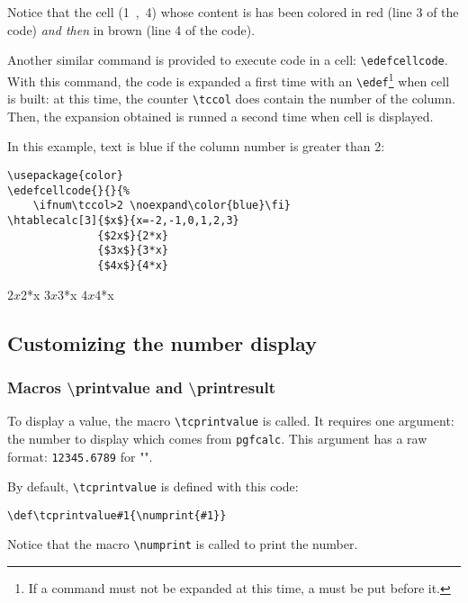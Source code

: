 \documentclass[a4paper,10pt]{article}
\newcommand\verbinline{\lstinline[breaklines=false,basicstyle=\normalsize\ttfamily]}
\newcommand\mywidth{0.85\linewidth}
\begin{document}
Notice that the cell (1~,~4) whose content is {\color{brown}} has been colored in red (line 3 of the code) \emph{and then} in brown (line 4 of the code).\bigskip

Another similar command is provided to execute code in a cell: \verbinline|\edefcellcode|. With this command, the code is expanded a first time with an \verbinline|\edef|\footnote{If a command must not be expanded at this time, a \texttt{\string\noexpand} must be put before it.} when cell is built: at this time, the counter \verbinline|\tccol| does contain the number of the column. Then, the expansion obtained is runned a second time when cell is displayed.\medskip

In this example, text is blue if the column number is greater than 2:
\begin{center}
\begin{minipage}{\mywidth}
\begin{lstlisting}
\usepackage{color}
\edefcellcode{}{}{%
	\ifnum\tccol>2 \noexpand\color{blue}\fi}
\htablecalc[3]{$x$}{x=-2,-1,0,1,2,3}
              {$2x$}{2*x}
              {$3x$}{3*x}
              {$4x$}{4*x}
\end{lstlisting}
\end{minipage}

\edefcellcode{}{}{%
	\ifnum\tccol>2 \noexpand\color{blue}\fi}
              {$2x$}{2*x}
              {$3x$}{3*x}
              {$4x$}{4*x}
\end{center}

\subsection{Customizing the number display}
\subsubsection{Macros {\ttfamily\textbackslash printvalue} and {\ttfamily\textbackslash printresult}}\label{persoaffichage}
To display a value, the macro \verbinline|\tcprintvalue| is called. It requires one argument: the number to display which comes from \verb|pgfcalc|. This argument has a raw format: \verb|12345.6789| for "".

By default, \verbinline|\tcprintvalue| is defined with this code:\par\nobreak\smallskip
\hfill\verbinline|\def\tcprintvalue#1{\numprint{#1}}|\hfill{}
\smallskip

Notice that the macro \verb|\numprint| is called to print the number.\bigskip
\end{document}
